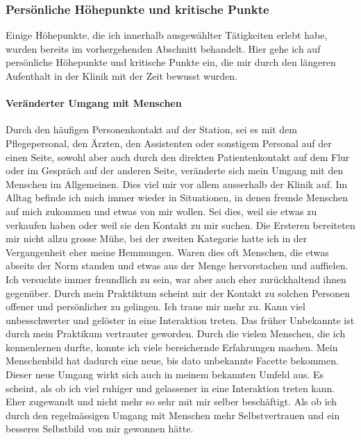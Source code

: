 \subsubsection{Persönliche Höhepunkte und kritische Punkte} \label{sec:Höhepunkte}
Einige Höhepunkte, die ich innerhalb ausgewählter Tätigkeiten erlebt habe, wurden bereits im vorhergehenden Abschnitt behandelt. Hier gehe ich auf persönliche Höhepunkte und kritische Punkte ein, die mir durch den längeren Aufenthalt in der Klinik mit der Zeit bewusst wurden. 

\paragraph{Veränderter Umgang mit Menschen}
Durch den häufigen Personenkontakt auf der Station, sei es mit dem Pflegepersonal, den Ärzten, den Assistenten oder sonstigem Personal auf der einen Seite, sowohl aber auch durch den direkten Patientenkontakt auf dem Flur oder im Gespräch auf der anderen Seite, veränderte sich mein Umgang mit den Menschen im Allgemeinen. Dies viel mir vor allem ausserhalb der Klinik auf. Im Alltag befinde ich mich immer wieder in Situationen, in denen fremde Menschen auf mich zukommen und etwas von mir wollen. Sei dies, weil sie etwas zu verkaufen haben oder weil sie den Kontakt zu mir suchen. Die Ersteren bereiteten mir nicht allzu grosse Mühe, bei der zweiten Kategorie hatte ich in der Vergangenheit eher meine Hemmungen. Waren dies oft Menschen, die etwas abseits der Norm standen und etwas aus der Menge hervorstachen und auffielen. Ich versuchte immer freundlich zu sein, war aber auch eher zurückhaltend ihnen gegenüber. Durch mein Praktiktum scheint mir der Kontakt zu solchen Personen offener und persönlicher zu gelingen. Ich traue mir mehr zu. Kann viel unbesschwerter und gelöster in eine Interaktion treten. Das früher Unbekannte ist durch mein Praktikum vertrauter geworden. Durch die vielen Menschen, die ich kennenlernen durfte, konnte ich viele bereichernde Erfahrungen machen. Mein Menschenbild hat dadurch eine neue, bis dato unbekannte Facette bekommen. Dieser neue Umgang wirkt sich auch in meinem bekannten Umfeld aus. Es scheint, als ob ich viel ruhiger und gelassener in eine Interaktion treten kann. Eher zugewandt und nicht mehr so sehr mit mir selber beschäftigt. Als ob ich durch den regelmässigen Umgang mit Menschen mehr Selbstvertrauen und ein besseres Selbstbild von mir gewonnen hätte. 

